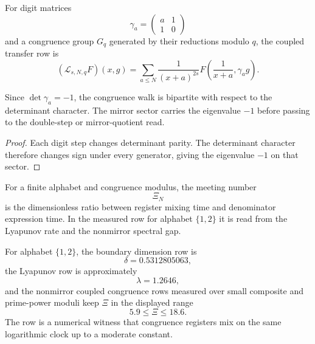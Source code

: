 \begin{definition}
\label{def:innovation-input-boundary-congruence-transfer-row}
For digit matrices
$$
\gamma_a=
\begin{pmatrix}
a&1\\
1&0
\end{pmatrix}
$$
and a congruence group $G_q$ generated by their reductions modulo $q$, the
coupled transfer row is
$$
(\mathcal L_{s,N,q}F)(x,g)
=
\sum_{a\le N}\frac{1}{(x+a)^{2s}}
F\left(\frac1{x+a},\gamma_ag\right).
$$
\end{definition}

\begin{theorem}
\label{thm:innovation-input-boundary-mirror-bipartition}
Since $\det\gamma_a=-1$, the congruence walk is bipartite with respect to
the determinant character. The mirror sector carries the eigenvalue $-1$
before passing to the double-step or mirror-quotient read.
\end{theorem}

\begin{proof}
Each digit step changes determinant parity. The determinant character
therefore changes sign under every generator, giving the eigenvalue $-1$
on that sector.
\end{proof}

\begin{definition}
\label{def:innovation-input-boundary-meeting-number}
For a finite alphabet and congruence modulus, the meeting number
$$
\Xi_N
$$
is the dimensionless ratio between register mixing time and denominator
expression time. In the measured row for alphabet $\{1,2\}$ it is read from
the Lyapunov rate and the nonmirror spectral gap.
\end{definition}

\begin{principle}
\label{prin:innovation-input-boundary-measured-alphabet-two-row}
For alphabet $\{1,2\}$, the boundary dimension row is
$$
\delta=0.5312805063,
$$
the Lyapunov row is approximately
$$
\lambda=1.2646,
$$
and the nonmirror coupled congruence rows measured over small composite and
prime-power moduli keep $\Xi$ in the displayed range
$$
5.9\le\Xi\le18.6.
$$
The row is a numerical witness that congruence registers mix on the same
logarithmic clock up to a moderate constant.
\end{principle}


